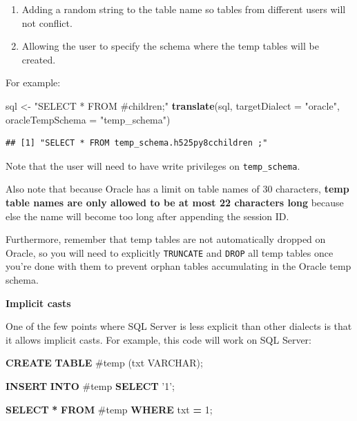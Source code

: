\documentclass[11pt]{book}
\newenvironment{Shaded}{\begin{snugshade}}{\end{snugshade}}
\newcommand{\DataTypeTok}[1]{\textcolor[rgb]{0.13,0.29,0.53}{#1}}
\newcommand{\DecValTok}[1]{\textcolor[rgb]{0.00,0.00,0.81}{#1}}
\newcommand{\KeywordTok}[1]{\textcolor[rgb]{0.13,0.29,0.53}{\textbf{#1}}}
\newcommand{\NormalTok}[1]{#1}
\newcommand{\OperatorTok}[1]{\textcolor[rgb]{0.81,0.36,0.00}{\textbf{#1}}}
\newcommand{\StringTok}[1]{\textcolor[rgb]{0.31,0.60,0.02}{#1}}
\providecommand{\tightlist}{%
  \setlength{\itemsep}{0pt}\setlength{\parskip}{0pt}}
\theoremstyle{definition}
\theoremstyle{definition}
\theoremstyle{definition}
\theoremstyle{remark}
\begin{document}
\begin{enumerate}
\def\labelenumi{\arabic{enumi}.}
\tightlist
\item
  Adding a random string to the table name so tables from different users will not conflict.
\item
  Allowing the user to specify the schema where the temp tables will be created.
\end{enumerate}

For example:

\begin{Shaded}
\begin{Highlighting}[]
\NormalTok{sql <-}\StringTok{ "SELECT * FROM #children;"}
\KeywordTok{translate}\NormalTok{(sql, }\DataTypeTok{targetDialect =} \StringTok{"oracle"}\NormalTok{, }\DataTypeTok{oracleTempSchema =} \StringTok{"temp_schema"}\NormalTok{)}
\end{Highlighting}
\end{Shaded}

\begin{verbatim}
## [1] "SELECT * FROM temp_schema.h525py8cchildren ;"
\end{verbatim}

Note that the user will need to have write privileges on \texttt{temp\_schema}.

Also note that because Oracle has a limit on table names of 30 characters, \textbf{temp table names are only allowed to be at most 22 characters long} because else the name will become too long after appending the session ID.

Furthermore, remember that temp tables are not automatically dropped on Oracle, so you will need to explicitly \texttt{TRUNCATE} and \texttt{DROP} all temp tables once you're done with them to prevent orphan tables accumulating in the Oracle temp schema.

\textbf{Implicit casts}

One of the few points where SQL Server is less explicit than other dialects is that it allows implicit casts. For example, this code will work on SQL Server:

\begin{Shaded}
\begin{Highlighting}[]
\KeywordTok{CREATE} \KeywordTok{TABLE}\NormalTok{ #temp (txt }\DataTypeTok{VARCHAR}\NormalTok{);}

\KeywordTok{INSERT} \KeywordTok{INTO}\NormalTok{ #temp}
\KeywordTok{SELECT} \StringTok{'1'}\NormalTok{;}

\KeywordTok{SELECT} \OperatorTok{*} \KeywordTok{FROM}\NormalTok{ #temp }\KeywordTok{WHERE}\NormalTok{ txt }\OperatorTok{=} \DecValTok{1}\NormalTok{;}
\end{Highlighting}
\end{Shaded}
\end{document}
